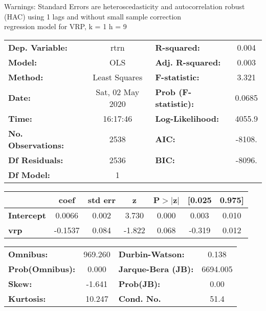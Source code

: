 Warnings: \newline
 [1] Standard Errors are heteroscedasticity and autocorrelation robust (HAC) using 1 lags and without small sample correction\\ 

regression model for VRP, k = 1 h = 9\begin{center}
\begin{tabular}{lclc}
\toprule
\textbf{Dep. Variable:}    &       rtrn       & \textbf{  R-squared:         } &     0.004   \\
\textbf{Model:}            &       OLS        & \textbf{  Adj. R-squared:    } &     0.003   \\
\textbf{Method:}           &  Least Squares   & \textbf{  F-statistic:       } &     3.321   \\
\textbf{Date:}             & Sat, 02 May 2020 & \textbf{  Prob (F-statistic):} &   0.0685    \\
\textbf{Time:}             &     16:17:46     & \textbf{  Log-Likelihood:    } &    4055.9   \\
\textbf{No. Observations:} &        2538      & \textbf{  AIC:               } &    -8108.   \\
\textbf{Df Residuals:}     &        2536      & \textbf{  BIC:               } &    -8096.   \\
\textbf{Df Model:}         &           1      & \textbf{                     } &             \\
\bottomrule
\end{tabular}
\begin{tabular}{lcccccc}
                   & \textbf{coef} & \textbf{std err} & \textbf{z} & \textbf{P$> |$z$|$} & \textbf{[0.025} & \textbf{0.975]}  \\
\midrule
\textbf{Intercept} &       0.0066  &        0.002     &     3.730  &         0.000        &        0.003    &        0.010     \\
\textbf{vrp}       &      -0.1537  &        0.084     &    -1.822  &         0.068        &       -0.319    &        0.012     \\
\bottomrule
\end{tabular}
\begin{tabular}{lclc}
\textbf{Omnibus:}       & 969.260 & \textbf{  Durbin-Watson:     } &    0.138  \\
\textbf{Prob(Omnibus):} &   0.000 & \textbf{  Jarque-Bera (JB):  } & 6694.005  \\
\textbf{Skew:}          &  -1.641 & \textbf{  Prob(JB):          } &     0.00  \\
\textbf{Kurtosis:}      &  10.247 & \textbf{  Cond. No.          } &     51.4  \\
\bottomrule
\end{tabular}
\end{center}

